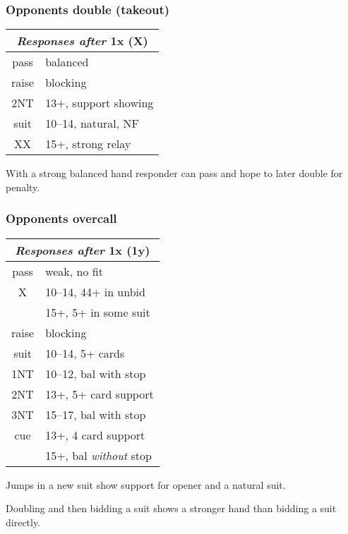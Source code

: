 \documentclass[a4paper, twoside, 11pt]{article}
\begin{document}
\begin{multicols}{3}
\subsubsection*{Opponents double (takeout)}

\begin{center}
\begin{tabular}{ |c|l| }
 \hline
 \multicolumn{2}{|c|}{\textit{Responses after} 1x (X)} \\
 \hline
 pass & balanced\\
 raise &  blocking\\
 \textnormal{2NT} & 13+, support showing\\
 suit & 10--14, natural, NF\\
 XX & 15+, strong relay\\
 \hline
\end{tabular}
\end{center}

With a strong balanced hand responder can pass and hope to later double for penalty.

\subsubsection*{Opponents overcall}

\begin{center}
\begin{tabular}{ |c|l| }
 \hline
 \multicolumn{2}{|c|}{\textit{Responses after} 1x (1y)} \\
 \hline
 pass & weak, no fit \\
 X & 10--14, 44+ in unbid\\
  & 15+, 5+ in some suit\\
 raise &  blocking\\
 suit & 10--14, 5+ cards\\
 \textnormal{1NT} & 10--12, bal with stop \\
 \textnormal{2NT} & 13+, 5+ card support\\
 \textnormal{3NT} & 15--17, bal with stop \\
 cue & 13+, 4 card support \\
     & 15+, bal \textit{without} stop\\
 \hline
\end{tabular}
\end{center}

Jumps in a new suit show support for opener and a natural suit.

Doubling and then bidding a suit shows a stronger hand than bidding a suit directly.



\end{multicols}
\end{document}
